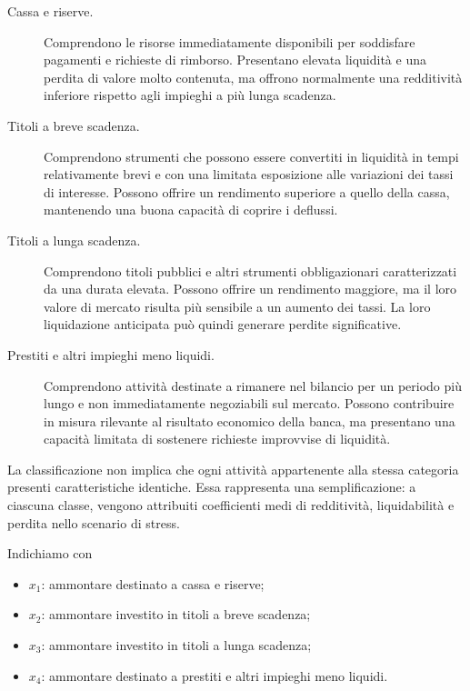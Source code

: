 \begin{description}

\item[Cassa e riserve.]

Comprendono le risorse immediatamente disponibili per soddisfare pagamenti e
richieste di rimborso. Presentano elevata liquidit\`a e una perdita di valore
molto contenuta, ma offrono normalmente una redditivit\`a inferiore rispetto
agli impieghi a pi\`u lunga scadenza.

\item[Titoli a breve scadenza.]

Comprendono strumenti che possono essere convertiti in liquidit\`a in tempi
relativamente brevi e con una limitata esposizione alle variazioni dei tassi
di interesse. Possono offrire un rendimento superiore a quello della cassa,
mantenendo una buona capacit\`a di coprire i deflussi.

\item[Titoli a lunga scadenza.]

Comprendono titoli pubblici e altri strumenti obbligazionari caratterizzati da
una durata elevata. Possono offrire un rendimento maggiore, ma il loro valore
di mercato risulta pi\`u sensibile a un aumento dei tassi. La loro
liquidazione anticipata pu\`o quindi generare perdite significative.

\item[Prestiti e altri impieghi meno liquidi.]

Comprendono attivit\`a destinate a rimanere nel bilancio per un periodo pi\`u
lungo e non immediatamente negoziabili sul mercato. Possono contribuire in
misura rilevante al risultato economico della banca, ma presentano una
capacit\`a limitata di sostenere richieste improvvise di liquidit\`a.

\end{description}

La classificazione non implica che ogni attivit\`a appartenente alla stessa
categoria presenti caratteristiche identiche. Essa rappresenta una
semplificazione: a ciascuna classe, vengono attribuiti coefficienti medi di
redditivit\`a, liquidabilit\`a e perdita nello scenario di stress.

Indichiamo con
\begin{itemize}

\item $x_1$: ammontare destinato a cassa e riserve;

\item $x_2$: ammontare investito in titoli a breve scadenza;

\item $x_3$: ammontare investito in titoli a lunga scadenza;

\item $x_4$: ammontare destinato a prestiti e altri impieghi meno liquidi.

\end{itemize}

